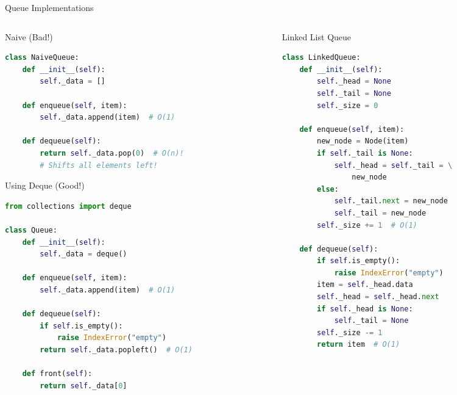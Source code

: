 \documentclass[aspectratio=169,xcolor=dvipsnames]{beamer}
\begin{document}
\begin{frame}[fragile]{Queue Implementations}
  \begin{columns}
    \begin{column}{0.48\textwidth}
      \begin{alertblock}{Naive (Bad!)}
        \begin{lstlisting}[language=Python,basicstyle=\tiny\ttfamily]
class NaiveQueue:
    def __init__(self):
        self._data = []

    def enqueue(self, item):
        self._data.append(item)  # O(1)

    def dequeue(self):
        return self._data.pop(0)  # O(n)!
        # Shifts all elements left!
        \end{lstlisting}
      \end{alertblock}

      \begin{exampleblock}{Using Deque (Good!)}
        \begin{lstlisting}[language=Python,basicstyle=\tiny\ttfamily]
from collections import deque

class Queue:
    def __init__(self):
        self._data = deque()

    def enqueue(self, item):
        self._data.append(item)  # O(1)

    def dequeue(self):
        if self.is_empty():
            raise IndexError("empty")
        return self._data.popleft()  # O(1)

    def front(self):
        return self._data[0]
        \end{lstlisting}
      \end{exampleblock}
    \end{column}
    \begin{column}{0.48\textwidth}
      \begin{exampleblock}{Linked List Queue}
        \begin{lstlisting}[language=Python,basicstyle=\tiny\ttfamily]
class LinkedQueue:
    def __init__(self):
        self._head = None
        self._tail = None
        self._size = 0

    def enqueue(self, item):
        new_node = Node(item)
        if self._tail is None:
            self._head = self._tail = \
                new_node
        else:
            self._tail.next = new_node
            self._tail = new_node
        self._size += 1  # O(1)

    def dequeue(self):
        if self.is_empty():
            raise IndexError("empty")
        item = self._head.data
        self._head = self._head.next
        if self._head is None:
            self._tail = None
        self._size -= 1
        return item  # O(1)
        \end{lstlisting}
      \end{exampleblock}
    \end{column}
  \end{columns}
\end{frame}
\end{document}
